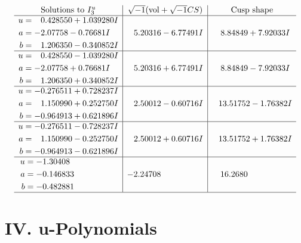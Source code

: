 \documentclass[1p]{elsarticle_modified}
\theoremstyle{definition}
\newcommand{\I}{\sqrt{-1}}
\begin{document}
$$\begin{array}{c|c|c}  
\text{Solutions to }I^u_{3}& \I (\text{vol} + \sqrt{-1}CS) & \text{Cusp shape}\\
 \hline 
\begin{aligned}
u &= \phantom{-}0.428550 + 1.039280 I \\
a &= -2.07758 - 0.76681 I \\
b &= \phantom{-}1.206350 - 0.340852 I\end{aligned}
 & \phantom{-}5.20316 - 6.77491 I & \phantom{-}8.84849 + 7.92033 I \\ \hline\begin{aligned}
u &= \phantom{-}0.428550 - 1.039280 I \\
a &= -2.07758 + 0.76681 I \\
b &= \phantom{-}1.206350 + 0.340852 I\end{aligned}
 & \phantom{-}5.20316 + 6.77491 I & \phantom{-}8.84849 - 7.92033 I \\ \hline\begin{aligned}
u &= -0.276511 + 0.728237 I \\
a &= \phantom{-}1.150990 + 0.252750 I \\
b &= -0.964913 + 0.621896 I\end{aligned}
 & \phantom{-}2.50012 - 0.60716 I & \phantom{-}13.51752 - 1.76382 I \\ \hline\begin{aligned}
u &= -0.276511 - 0.728237 I \\
a &= \phantom{-}1.150990 - 0.252750 I \\
b &= -0.964913 - 0.621896 I\end{aligned}
 & \phantom{-}2.50012 + 0.60716 I & \phantom{-}13.51752 + 1.76382 I \\ \hline\begin{aligned}
u &= -1.30408\phantom{ +0.000000I} \\
a &= -0.146833\phantom{ +0.000000I} \\
b &= -0.482881\phantom{ +0.000000I}\end{aligned}
 & -2.24708\phantom{ +0.000000I} & \phantom{-}16.2680\phantom{ +0.000000I}\\
 \hline 
 \end{array}$$\newpage
\newpage\renewcommand{\arraystretch}{1}
\centering \section*{ IV. u-Polynomials}
\end{document}
